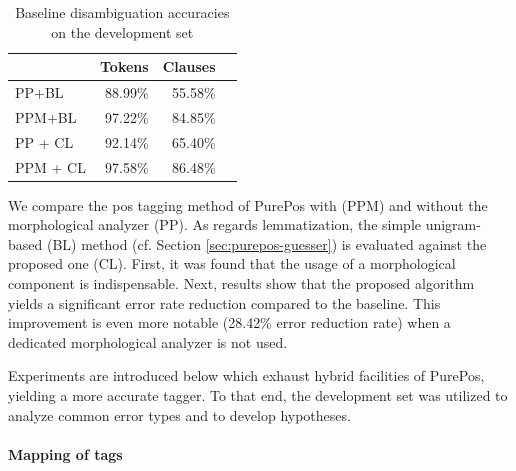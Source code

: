 \begin{table}[H]
\centering
\caption{Baseline disambiguation accuracies on the development set}\label{tab:oldhun-baselines}
\begin{tabular}{l r r r}
\hline
 & Tokens & Clauses \\
\hline
PP+BL  & 88.99\% & 55.58\% \\
PPM+BL  & 97.22\% & 84.85\% \\
PP + CL & 92.14\% & 65.40\% \\
PPM + CL & 97.58\% & 86.48\% \\
\hline
\end{tabular}
\end{table}




We compare the \gls{pos} tagging method of PurePos with (PPM) and without the morphological analyzer (PP).
As regards lemmatization, the simple unigram-based (BL) method (cf. Section \ref{sec:purepos-guesser}) is evaluated against the proposed one (CL). 
First, it was found that the usage of a morphological component is indispensable. 
Next, results show that the proposed algorithm yields a significant error rate reduction compared to the baseline. 
This improvement is even more notable  (28.42\% error reduction rate) when a dedicated morphological analyzer is not used.

Experiments are introduced below which exhaust hybrid facilities of PurePos, yielding a more accurate tagger. 
To that end, the development set was utilized to analyze common error types and to develop hypotheses.

\paragraph{Mapping of tags}

